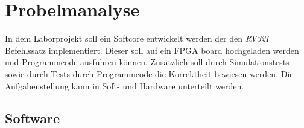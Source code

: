 \chapter{Probelmanalyse}

    In dem Laborprojekt soll ein Softcore entwickelt werden der den \textit{RV32I} Befehlssatz implementiert.
    Dieser soll auf ein FPGA board hochgeladen werden und Programmcode ausführen können.
    Zusätzlich soll durch Simulationstests sowie durch Tests durch Programmcode die Korrektheit
    bewiesen werden.
    Die Aufgabenstellung kann in Soft- und Hardware unterteilt werden.

        \section{Software}


